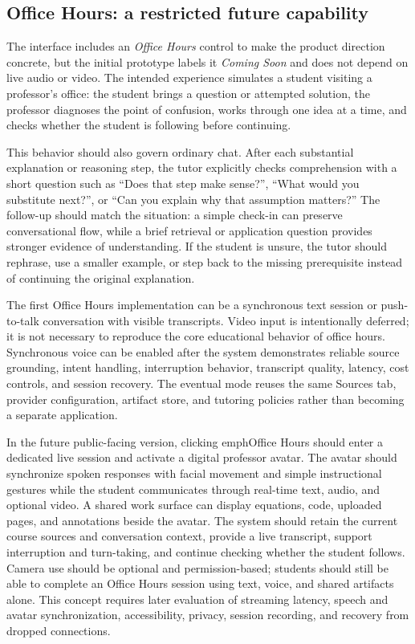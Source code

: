 \documentclass[11pt]{article}
\begin{document}
\subsection{Office Hours: a restricted future capability}
The interface includes an \emph{Office Hours} control to make the product direction concrete, but the initial prototype labels it \emph{Coming Soon} and does not depend on live audio or video. The intended experience simulates a student visiting a professor's office: the student brings a question or attempted solution, the professor diagnoses the point of confusion, works through one idea at a time, and checks whether the student is following before continuing.

This behavior should also govern ordinary chat. After each substantial explanation or reasoning step, the tutor explicitly checks comprehension with a short question such as ``Does that step make sense?'', ``What would you substitute next?'', or ``Can you explain why that assumption matters?'' The follow-up should match the situation: a simple check-in can preserve conversational flow, while a brief retrieval or application question provides stronger evidence of understanding. If the student is unsure, the tutor should rephrase, use a smaller example, or step back to the missing prerequisite instead of continuing the original explanation.

The first Office Hours implementation can be a synchronous text session or push-to-talk conversation with visible transcripts. Video input is intentionally deferred; it is not necessary to reproduce the core educational behavior of office hours. Synchronous voice can be enabled after the system demonstrates reliable source grounding, intent handling, interruption behavior, transcript quality, latency, cost controls, and session recovery. The eventual mode reuses the same Sources tab, provider configuration, artifact store, and tutoring policies rather than becoming a separate application.

In the future public-facing version, clicking emph{Office Hours} should enter a dedicated live session and activate a digital professor avatar. The avatar should synchronize spoken responses with facial movement and simple instructional gestures while the student communicates through real-time text, audio, and optional video. A shared work surface can display equations, code, uploaded pages, and annotations beside the avatar. The system should retain the current course sources and conversation context, provide a live transcript, support interruption and turn-taking, and continue checking whether the student follows. Camera use should be optional and permission-based; students should still be able to complete an Office Hours session using text, voice, and shared artifacts alone. This concept requires later evaluation of streaming latency, speech and avatar synchronization, accessibility, privacy, session recording, and recovery from dropped connections.
\end{document}
